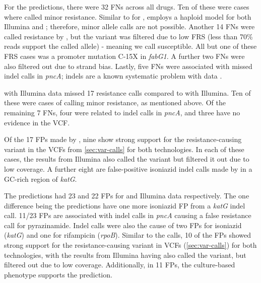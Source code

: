 For the \drprg{} \ont{} predictions, there were 32 FNs across all drugs. Ten of these were cases where \mykrobe{} called minor resistance. Similar to \mykrobe{} for \ont{}, \drprg{} employs a haploid model for both Illumina and \ont{}; therefore, minor allele calls are not possible. Another 14 FNs were called resistance by \drprg{} \ont{}, but the variant was filtered due to low FRS (less than 70\% reads support the called allele) - meaning we call susceptible. All but one of these FRS cases was a promoter mutation C-15X in \textit{fabG1}. A further two FNs were also filtered out due to strand bias. Lastly, five FNs were associated with missed indel calls in \textit{pncA}; indels are a known systematic problem with \ont{} data \cite{watson2019}.

\drprg{} with Illumina data missed 17 resistance calls compared to \mykrobe{} with Illumina. Ten of these were cases of \mykrobe{} calling minor resistance, as mentioned above. Of the remaining 7 FNs, four were related to indel calls in \textit{pncA}, and three have no evidence in the \drprg{} VCF.

Of the 17 FPs made by \mykrobe{} \ont{}, nine show strong support for the resistance-causing variant in the VCFs from \autoref{sec:var-calls} for both technologies. In each of these cases, the \mykrobe{} results from Illumina also called the variant but filtered it out due to low coverage. A further eight are false-positive isoniazid indel calls made by \ont{} in a GC-rich region of \textit{katG}.

The \drprg{} predictions had 23 and 22 FPs for \ont{} and Illumina data respectively. The one difference being the \ont{} predictions have one more isoniazid FP from a \textit{katG} indel call. 11/23 FPs are associated with indel calls in \textit{pncA} causing a false resistance call for pyrazinamide. Indel calls were also the cause of two FPs for isoniazid (\textit{katG}) and one for rifampicin (\textit{rpoB}). Similar to the \mykrobe{} \ont{} calls, 10 of the \drprg{} FPs showed strong support for the resistance-causing variant in VCFs (\autoref{sec:var-calls}) for both technologies, with the \mykrobe{} results from Illumina having also called the variant, but filtered out due to low coverage. Additionally, in 11 FPs, the culture-based phenotype supports the \drprg{} prediction.


